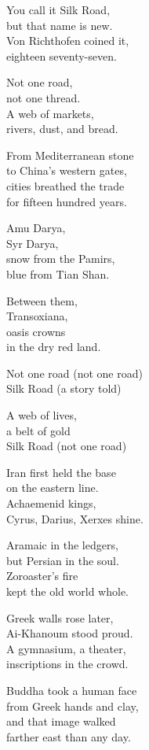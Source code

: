 \begin{lyrics}
You call it Silk Road,\\
but that name is new.\\
Von Richthofen coined it,\\
eighteen seventy-seven.

Not one road,\\
not one thread.\\
A web of markets,\\
rivers, dust, and bread.

From Mediterranean stone\\
to China’s western gates,\\
cities breathed the trade\\
for fifteen hundred years.

Amu Darya,\\
Syr Darya,\\
snow from the Pamirs,\\
blue from Tian Shan.

Between them,\\
Transoxiana,\\
oasis crowns\\
in the dry red land.

Not one road
(not one road)\\
Silk Road
(a story told)

A web of lives,\\
a belt of gold\\
Silk Road
(not one road)

Iran first held the base\\
on the eastern line.\\
Achaemenid kings,\\
Cyrus, Darius, Xerxes shine.

Aramaic in the ledgers,\\
but Persian in the soul.\\
Zoroaster’s fire\\
kept the old world whole.

Greek walls rose later,\\
Ai-Khanoum stood proud.\\
A gymnasium, a theater,\\
inscriptions in the crowd.

Buddha took a human face\\
from Greek hands and clay,\\
and that image walked\\
farther east than any day.


\end{lyrics}
